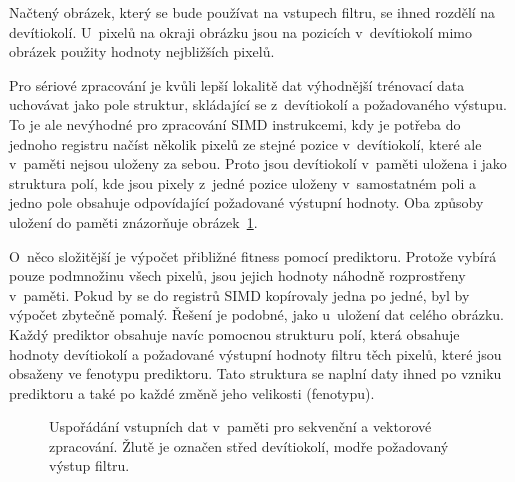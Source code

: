 Načtený obrázek, který se bude používat na vstupech filtru, se ihned rozdělí na devítiokolí. U~pixelů na okraji obrázku jsou na pozicích v~devítiokolí mimo obrázek použity hodnoty nejbližších pixelů.

Pro sériové zpracování je kvůli lepší lokalitě dat výhodnější trénovací data uchovávat jako pole struktur, skládající se z~devítiokolí a požadovaného výstupu. To je ale nevýhodné pro zpracování SIMD instrukcemi, kdy je potřeba do jednoho registru načíst několik pixelů ze stejné pozice v~devítiokolí, které ale v~paměti nejsou uloženy za sebou. Proto jsou devítiokolí v~paměti uložena i jako struktura polí, kde jsou pixely z~jedné pozice uloženy v~samostatném poli a jedno pole obsahuje odpovídající požadované výstupní hodnoty. Oba způsoby uložení do paměti znázorňuje obrázek~\ref{obrDevitiokoli}.

O~něco složitější je výpočet přibližné fitness pomocí prediktoru. Protože vybírá pouze podmnožinu všech pixelů, jsou jejich hodnoty náhodně rozprostřeny v~paměti. Pokud by se do registrů SIMD kopírovaly jedna po jedné, byl by výpočet zbytečně pomalý. Řešení je podobné, jako u~uložení dat celého obrázku. Každý prediktor obsahuje navíc pomocnou strukturu polí, která obsahuje hodnoty devítiokolí a požadované výstupní hodnoty filtru těch pixelů, které jsou obsaženy ve fenotypu prediktoru. Tato struktura se naplní daty ihned po vzniku prediktoru a také po každé změně jeho velikosti (fenotypu).

\begin{figure}[htb]
    \centering
    \baselineskip
    \baselineskip
    \caption{Uspořádání vstupních dat v~paměti pro sekvenční a vektorové zpracování. Žlutě je označen střed devítiokolí, modře požadovaný výstup filtru.}
    \label{obrDevitiokoli}
\end{figure}


